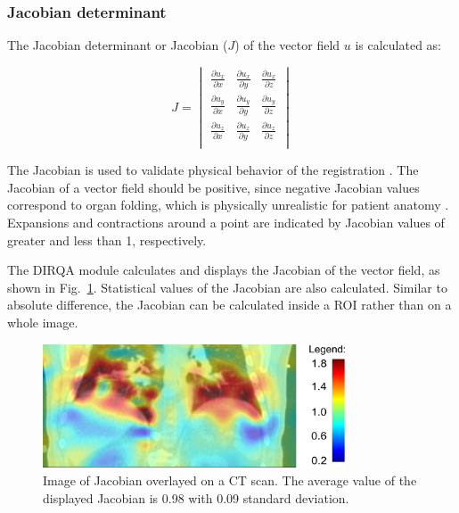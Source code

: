 \documentclass[type=dr, dr=rernat, accentcolor=tud7b,colorbacktitle, bigchapter, openright, twoside, 12pt ]{tudthesis}
\begin{document}
\newpage
\subsubsection{Jacobian determinant}
\label{Jacobian}

The Jacobian determinant or Jacobian ($J$) of the vector field $u$ is calculated as:



\begin{equation}
J = \begin{vmatrix} 
\frac{\partial u_x}{\partial x} & \frac{\partial u_x}{\partial y} & \frac{\partial u_x}{\partial z} \\
\frac{\partial u_y}{\partial x} & \frac{\partial u_y}{\partial y} & \frac{\partial u_y}{\partial z} \\
\frac{\partial u_z}{\partial x} & \frac{\partial u_z}{\partial y} & \frac{\partial u_z}{\partial z} \\
\end{vmatrix}
\end{equation}

The Jacobian is used to validate physical behavior of the registration \cite{Leow2007}. 
The Jacobian of a vector field should be positive, since negative Jacobian values correspond to organ folding, 
which is physically unrealistic for patient anatomy \cite{ Rey2002, Chen2008}. 
Expansions and contractions around a point are indicated by Jacobian values of greater and less than 1, respectively.

The DIRQA module calculates and displays the Jacobian of the vector field, as shown in Fig.~\ref{JacobianImage}. Statistical values of the Jacobian are also calculated. Similar to absolute difference, the Jacobian can be calculated inside a ROI rather than on a whole image.

\begin{figure}[H]
	\begin{center}		
		\includegraphics[width=0.8\textwidth]{./Images/jacobian.png}
		\caption{Image of Jacobian overlayed on a CT scan. The average value of the displayed Jacobian is 0.98 with 0.09 standard deviation.}
		\label{JacobianImage}
	\end{center}
\end{figure}
\end{document}
